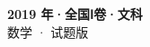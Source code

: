 \documentclass[zihao=-4, a4paper]{ctexart}
\begin{document}
\begin{center}
  {\Large\bfseries 2019 年·全国Ⅰ卷·文科}\\[4pt]
  {\large 数学 · 试题版}
\end{center}
\medskip
{}

\end{document}
